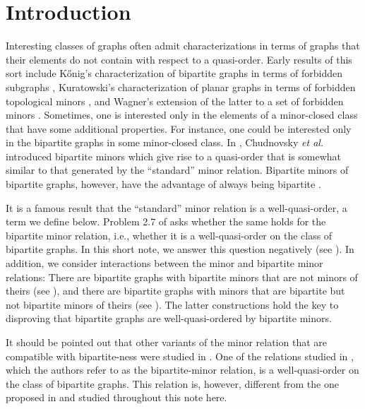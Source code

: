 \documentclass[a4paper,preprint,12pt]{elsarticle}
\newcommand{\therese}[1]{{\color{brown} TB says: #1}}
\newcommand{\therese}[1]{}
\newcommand{\etal}{\textit{et al.} }
\begin{document}
\section{Introduction}
\label{sec: intro}
Interesting classes of graphs often admit characterizations in terms of graphs that their elements do not contain with respect to a quasi-order.
Early results of this sort include K\H{o}nig's characterization of bipartite graphs in terms of forbidden subgraphs \cite{graphenAnwendungKonig}, Kuratowski's characterization of planar graphs in terms of forbidden topological minors \cite{Kuratowski1930}, and Wagner's extension of the latter to a set of forbidden minors \cite{wagnerDecompTheorem}.
Sometimes, one is interested only in the elements of a minor-closed class that have some additional properties.
For instance, one could be interested only in the bipartite graphs in some minor-closed class.
In \cite{bipartiteMinors}, Chudnovsky \etal introduced bipartite minors which give rise to a quasi-order that is somewhat similar to that generated by the \enquote{standard} minor relation.
Bipartite minors of bipartite graphs, however, have the advantage of always being bipartite \cite[p.~221]{bipartiteMinors}.

It is a famous result \cite{RSGraphMinorsXX} that the \enquote{standard} minor relation is a well-quasi-order, a term we define below.
Problem 2.7 of \cite{bipartiteMinors} asks whether the same holds for the bipartite minor relation, i.e., whether it is a well-quasi-order on the class of bipartite graphs.
In this short note, we answer this question negatively (see ).
In addition, we consider interactions between the minor and bipartite minor relations:
There are bipartite graphs with bipartite minors that are not minors of theirs (see ), and there are bipartite graphs with minors that are bipartite but not bipartite minors of theirs (see ).
The latter constructions hold the key to disproving that bipartite graphs are well-quasi-ordered by bipartite minors.

It should be pointed out that other variants of the minor relation that are compatible with bipartite-ness were studied in \cite{RecCharMaxBipPlanarGraphs}.
One of the relations studied in \cite{RecCharMaxBipPlanarGraphs}, which the authors refer to as the bipartite-minor relation, is a well-quasi-order on the class of bipartite graphs.
This relation is, however, different from the one proposed in \cite{bipartiteMinors} and studied throughout this note here.
\end{document}
